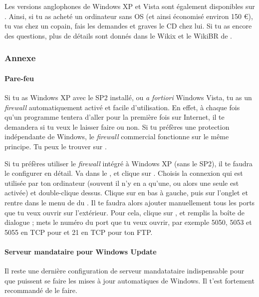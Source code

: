 Les versions anglophones de Windows XP et Vista sont également disponibles sur .
Ainsi, si tu as acheté un ordinateur sans OS (et ainsi économisé environ 150 \euro), tu vas chez un copain, fais les demandes et graves le CD chez lui. Si tu as encore des questions, plus de détails sont donnés dans le Wikix et le WikiBR de \fkz.


\subsubsection{Annexe}

\label{horsdomaine} %

\paragraph{Pare-feu} Si tu as Windows XP avec le SP2 installé, ou \emph{a fortiori}
Windows Vista, tu as un \emph{firewall} automatiquement activé et facile d'utilisation. En effet, à chaque fois qu'un programme tentera d'aller pour
la première fois sur Internet, il te demandera si tu veux le laisser faire ou non. Si tu préfères une protection indépendante de Windows, le
\emph{firewall} commercial  fonctionne sur le même principe. Tu peux le trouver sur \xshare.

Si tu préfères utiliser le \emph{firewall} intégré à Windows XP (sans le SP2), il te faudra le configurer en détail. Va dans le ,
 et clique sur . Choisis la connexion qui est utilisée par ton ordinateur (souvent il n'y en a qu'une, ou
alors une seule est activée) et double-clique dessus. Clique sur  en bas à gauche, puis sur l'onglet  et rentre dans le
menu de  du . Il te faudra alors ajouter manuellement tous les ports que tu veux ouvrir sur l'extérieur. Pour
cela, clique sur , et remplis la boîte de dialogue%
; mets le numéro du port que tu veux ouvrir, par exemple 5050, 5053 et 5055 en TCP pour  et 21 en TCP pour ton FTP.

\paragraph{Serveur mandataire pour Windows Update} Il reste une dernière configuration de
serveur mandatataire indispensable pour que puissent se faire les mises à jour automatiques
de Windows. Il t'est fortement recommandé de le faire.

